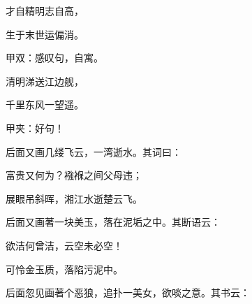 \begin{poem}
    \begin{pl}才自精明志自高，\end{pl}

    \begin{pl}生于末世运偏消。\end{pl}\begin{note}甲双：感叹句，自寓。\end{note}

    \begin{pl}清明涕送江边舰，\end{pl}

    \begin{pl}千里东风一望遥。\end{pl}\begin{note}甲夹：好句！\end{note}
\end{poem}

\begin{parag}

    后面又画几缕飞云，一湾逝水。其词曰：
\end{parag}

\begin{poem}
    \begin{pl}富贵又何为？襁褓之间父母违；\end{pl}

    \begin{pl}展眼吊斜晖，湘江水逝楚云飞。\end{pl}

\end{poem}

\begin{parag}

    后面又画著一块美玉，落在泥垢之中。其断语云：
\end{parag}
\begin{poem}
    \begin{pl}欲洁何曾洁，云空未必空！\end{pl}

    \begin{pl}可怜金玉质，落陷污泥中。\end{pl}
\end{poem}

\begin{parag}

    后面忽见画著个恶狼，追扑一美女，欲啖之意。其书云：
\end{parag}

